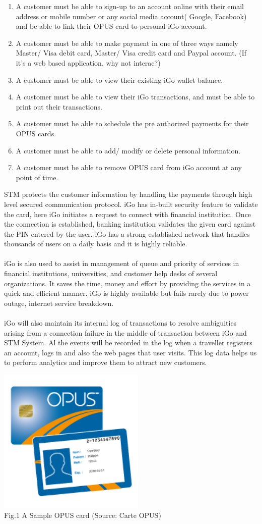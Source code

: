 \documentclass[a4paper, 11pt]{report}
\begin{document}
\begin{enumerate}
    \item A customer must be able to sign-up to an account online with their email address or mobile number or any social media account( Google, Facebook) and be able to link their OPUS card to personal iGo account.
    \item A customer must be able to make payment in one of three ways namely Master/ Visa debit card, Master/ Visa credit card and Paypal account. (If it's a web based application, why not interac?)
    \item A customer must be able to view their existing iGo wallet balance.
    \item A customer must be able to view their iGo transactions, and must be able to print out their transactions.
    \item A customer must be able to schedule the pre authorized payments for their OPUS cards.
    \item A customer must be able to add/ modify or delete personal information.
    \item A customer must be able to remove OPUS card from iGo account at any point of time.
    
\end{enumerate}

STM protects the customer information by handling the payments through high level secured communication protocol. iGo has in-built security feature  to validate the card, here iGo initiates a request to connect with financial institution. Once the connection is established, banking institution validates the given card against the PIN entered by the user. iGo has a strong established network that handles thousands of users on a daily basis and it is highly reliable.\\\\
iGo is also used to assist in management of queue and priority of services in financial institutions, universities, and customer help desks of several organizations. It saves the time, money and effort by providing the services in a quick and efficient manner. iGo is highly available but fails rarely due to power outage, internet service breakdown.\\\\
iGo will also maintain its internal log of transactions to resolve ambiguities arising from a connection failure in the middle of transaction between iGo and STM System. Al the events will be recorded in the log when a traveller registers an account, logs in and  also the web pages that user visits. This log data helps us to perform analytics and improve them to attract new customers.

\qquad\qquad\qquad\qquad \includegraphics[width=70mm,scale=0.5]
{opus.png}\\
\tab\tab\qquad\qquad Fig.1 A Sample OPUS card (Source: Carte OPUS)
\end{document}
